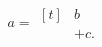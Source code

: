 \begin{equation}
  a = \begin{aligned}[t]
        & b     \\
        & + c .
      \end{aligned}
\end{equation}
